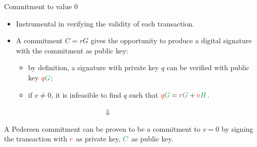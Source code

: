 \documentclass[usenames,dvipsnames]{beamer}
\begin{document}
        
    
    \begin{frame}{Commitment to value 0}
        \begin{itemize}
            \item Instrumental in verifying the validity of each transaction.
            \item A commitment $C = rG$ gives the opportunity to produce a digital signature with the commitment as public key:
            \begin{itemize}
                \item by definition, a signature with private key \color{red} $q$ \color{black} can be verified with public key $\color{red}q\color{ForestGreen}G$\color{black};
                \item if $v\neq0$, it is infeasible to find \color{red} $q$ \color{black}such that $\color{red}q\color{ForestGreen}G \color{black}= \color{red}r\color{ForestGreen}G \color{black}+ \color{red}v\color{ForestGreen}H$.
            \end{itemize}
        \end{itemize}
        $\qquad \qquad \qquad \qquad \qquad \qquad \qquad \Downarrow$
        \begin{center}
        A Pedersen commitment can be proven to be a commitment to $v=0$ by signing the transaction with $\color{red}r$ \color{black}as private key, $\color{ForestGreen}C$ \color{black}as public key.
        \end{center}
    \end{frame}
    
\end{document}
